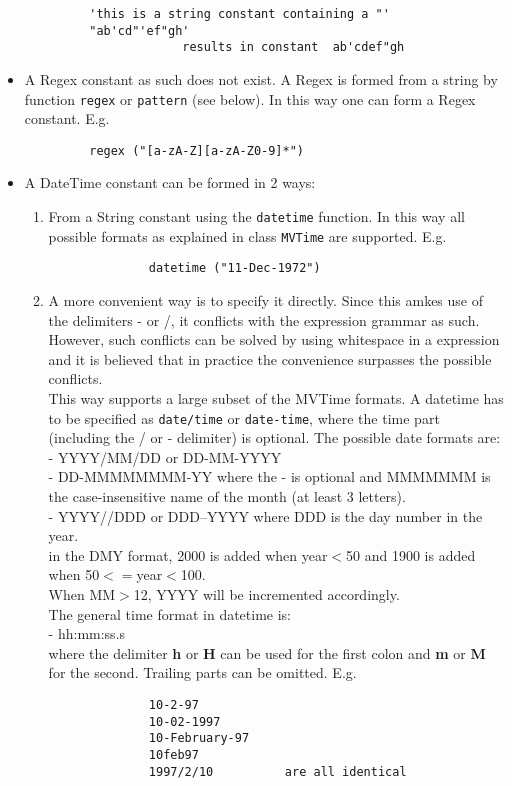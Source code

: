 \begin{itemize}
\begin{verbatim}
         'this is a string constant containing a "'
         "ab'cd"'ef"gh'
                      results in constant  ab'cdef"gh
       \end{verbatim}
  \item A Regex constant as such does not exist. A Regex is formed from a string
       by function \texttt{regex} or \texttt{pattern} (see below).
       In this way one can form a Regex constant. E.g.
       \begin{verbatim}
         regex ("[a-zA-Z][a-zA-Z0-9]*")
       \end{verbatim}
  \item A DateTime constant can be formed in 2 ways:
       \begin{enumerate}
         \item From a String constant using the \texttt{datetime} function.
              In this way all possible formats as explained in class
              \texttt{MVTime} are supported. E.g.
              \begin{verbatim}
              datetime ("11-Dec-1972")
              \end{verbatim}
         \item A more convenient way is to specify it directly. Since this
              amkes use of the delimiters - or /, it conflicts with the
              expression grammar as such. However, such conflicts can be
              solved by using whitespace in a expression and it is believed
              that in practice the convenience surpasses the possible
              conflicts.
              \\ This way supports a large subset of the MVTime formats.
              A datetime has to be specified as \texttt{date/time}
              or \texttt{date-time}, where the time part (including
              the / or - delimiter) is optional.
              The possible date formats are:
              \\- YYYY/MM/DD or DD-MM-YYYY
              \\- DD-MMMMMMMM-YY where the - is optional and MMMMMMM is the
              case-insensitive name of the month (at least 3 letters).
              \\- YYYY//DDD or DDD--YYYY where DDD is the day number in
              the year.
              \\in the DMY format, 2000 is added when year$<$50 and
              1900 is added when 50$<=$year$<$100.
              \\When MM$>$12, YYYY will be incremented accordingly.
              \\The general time format in datetime is:
              \\- hh:mm:ss.s
              \\where the delimiter \textbf{h} or \textbf{H} can be used
              for the first colon and \textbf{m} or \textbf{M} for the second.
              Trailing parts can be omitted. E.g.
              \begin{verbatim}
              10-2-97
              10-02-1997
              10-February-97
              10feb97
              1997/2/10          are all identical


\end{verbatim}
\end{enumerate}
\end{itemize}
